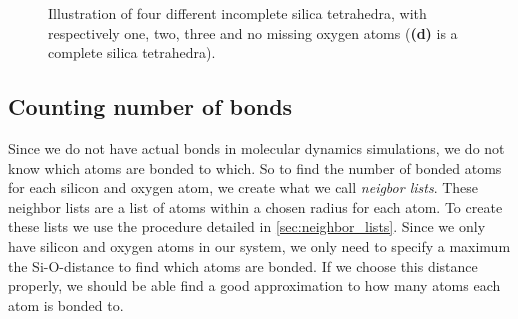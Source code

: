 \begin{figure}[htpb]
\begin{subfigure}[c]{1.1\myfigwidth}
        \caption{}%
    \end{subfigure}%
    \caption{%
        Illustration of four different incomplete silica tetrahedra, with respectively one, two, three and no missing oxygen atoms (\textbf{(d)} is a complete silica tetrahedra).%
    }%
    \label{fig:passivation}%
\end{figure}%

\subsection{Counting number of bonds}
Since we do not have actual bonds in molecular dynamics simulations, we do not know which atoms are bonded to which. So to find the number of bonded atoms for each silicon and oxygen atom, we create what we call \emph{neigbor lists}. These neighbor lists are a list of atoms within a chosen radius for each atom. To create these lists we use the procedure detailed in \cref{sec:neighbor_lists}. Since we only have silicon and oxygen atoms in our system, we only need to specify a maximum the Si-O-distance to find which atoms are bonded. If we choose this distance properly, we should be able find a good approximation to how many atoms each atom is bonded to.



